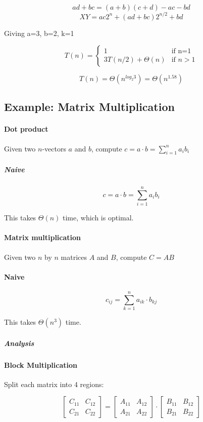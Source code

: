 \documentclass[a4paper]{article}
\begin{document}
\[ ad + bc = (a+b)(c+d) - ac - bd\]
\[ XY = ac2^n + (ad+bc)2^{n/2} + bd \]

Giving a=3, b=2, k=1

\[
T(n)=
\begin{cases}
1 & \text{if n=1}\\
3T(n/2)+\Theta(n) & \text{if }n>1
\end{cases}
\]

\[ T(n) = \Theta(n^{log_2 3}) = \Theta(n^{1.58}) \]

\subsection{Example: Matrix Multiplication}

\paragraph{Dot product}
Given two $n$-vectors $a$ and $b$, compute $c=a\cdot b = \sum\limits_{i=1}^na_ib_i$

\subparagraph{Naive}
\[ c = a \cdot b = \sum_{i=1}^n a_i b_i\]

This takes $\Theta(n)$ time, which is optimal.

\paragraph{Matrix multiplication}
Given two $n$ by $n$ matrices $A$ and $B$, compute $C=AB$

\paragraph{Naive}
\[ c_{ij} = \sum_{k=1}^n a_{ik} \cdot b_{kj}\]

This takes $\Theta(n^3)$ time.

\subparagraph{Analysis}

\paragraph{Block Multiplication}

Split each matrix into 4 regions:

\[
\begin{bmatrix}
  C_{11}&C_{12}\\
  C_{21}&C_{22}
\end{bmatrix}
=
\begin{bmatrix}
  A_{11}&A_{12}\\
  A_{21}&A_{22}
\end{bmatrix}
\cdot
\begin{bmatrix}
  B_{11}&B_{12}\\
  B_{21}&B_{22}
\end{bmatrix}
\]
\end{document}
